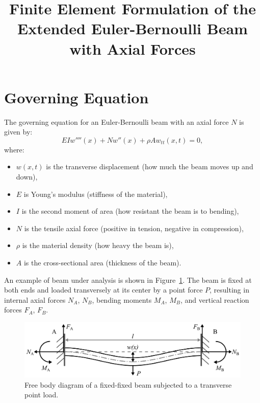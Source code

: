 \documentclass{article}
\begin{document}
	
	\title{Finite Element Formulation of the Extended Euler-Bernoulli Beam with Axial Forces}
	\author{}
	\date{}
	\maketitle
	
	\section*{Governing Equation}
	
	The governing equation for an Euler-Bernoulli beam with an axial force $N$ is given by:
	\begin{equation}
		EI w''''(x) + N w''(x) + \rho A w_{tt}(x,t) = 0,
	\end{equation}
	where:
	\begin{itemize}
		\item $w(x, t)$ is the transverse displacement (how much the beam moves up and down),
		\item $E$ is Young’s modulus (stiffness of the material),
		\item $I$ is the second moment of area (how resistant the beam is to bending),
		\item $N$ is the tensile axial force (positive in tension, negative in compression),
		\item $\rho$ is the material density (how heavy the beam is),
		\item $A$ is the cross-sectional area (thickness of the beam).
	\end{itemize}
	An example of beam under analysis is shown in Figure~\ref{fig:FFB}. The beam is fixed at both ends and loaded transversely at its center by a point force $P$, resulting in internal axial forces $N_A$, $N_B$, bending moments $M_A$, $M_B$, and vertical reaction forces $F_A$, $F_B$.
	\begin{figure} [H]
		\centering
		\includegraphics[width=4.7in]{Figures/FFB_Figure.png}
		\caption[FFB] 
		{ \label{fig:FFB} 
			Free body diagram of a fixed-fixed beam subjected to a transverse point load.}
	\end{figure} 
	
\end{document}
